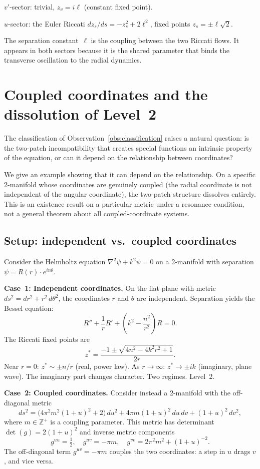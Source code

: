 \documentclass{amsart}
\theoremstyle{definition}
\theoremstyle{remark}
\begin{document}
$v'$-sector: trivial, $z_v = i\ell$ (constant fixed point).

$u$-sector: the Euler Riccati $dz_s/ds = -z_s^2 + 2\ell^2$, fixed points $z_s = \pm\ell\sqrt{2}$.

The separation constant~$\ell$ is the coupling between the two Riccati flows. It appears in both sectors because it is the shared parameter that binds the transverse oscillation to the radial dynamics.

\section{Coupled coordinates and the dissolution of Level~2}\label{sec:coupled}

The classification of Observation~\ref{obs:classification} raises a natural question: is the two-patch incompatibility that creates special functions an intrinsic property of the equation, or can it depend on the relationship between coordinates?

We give an example showing that it can depend on the relationship. On a specific 2-manifold whose coordinates are genuinely coupled (the radial coordinate is not independent of the angular coordinate), the two-patch structure dissolves entirely. This is an existence result on a particular metric under a resonance condition, not a general theorem about all coupled-coordinate systems.

\subsection{Setup: independent vs.\ coupled coordinates}

Consider the Helmholtz equation $\nabla^2\psi + k^2\psi = 0$ on a 2-manifold with separation $\psi = R(r)\cdot e^{in\theta}$.

\textbf{Case~1: Independent coordinates.} On the flat plane with metric $ds^2 = dr^2 + r^2\,d\theta^2$, the coordinates $r$ and $\theta$ are independent. Separation yields the Bessel equation:
\[
R'' + \frac{1}{r}R' + \left(k^2 - \frac{n^2}{r^2}\right)R = 0.
\]
The Riccati fixed points are
\[
z^* = \frac{-1 \pm \sqrt{4n^2 - 4k^2 r^2 + 1}}{2r}.
\]
Near $r = 0$: $z^* \sim \pm n/r$ (real, power law). As $r \to \infty$: $z^* \to \pm ik$ (imaginary, plane wave). The imaginary part changes character. Two regimes. Level~2.

\textbf{Case~2: Coupled coordinates.} Consider instead a 2-manifold with the off-diagonal metric
\[
ds^2 = \bigl(4\pi^2 m^2(1{+}u)^2 + 2\bigr)\,du^2 + 4\pi m(1{+}u)^2\,du\,dv + (1{+}u)^2\,dv^2,
\]
where $m \in \mathbb{Z}^+$ is a coupling parameter. This metric has determinant $\det(g) = 2(1{+}u)^2$ and inverse metric components
\[
g^{uu} = \tfrac{1}{2}, \quad g^{uv} = -\pi m, \quad g^{vv} = 2\pi^2 m^2 + (1{+}u)^{-2}.
\]
The off-diagonal term $g^{uv} = -\pi m$ couples the two coordinates: a step in $u$ drags $v$, and vice versa.
\end{document}
